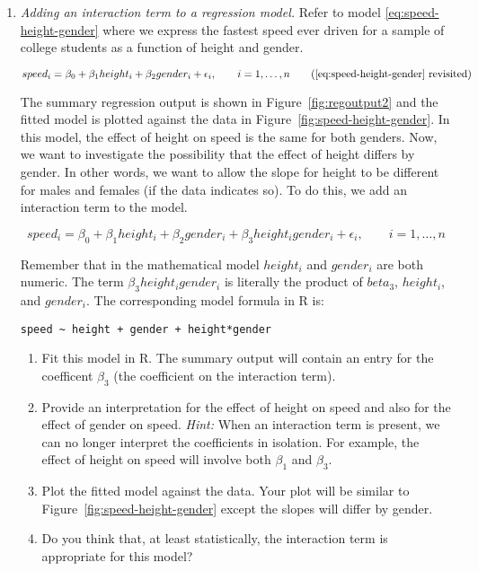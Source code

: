 \begin{enumerate}
\item \emph{Adding an interaction term to a regression model.}  Refer
  to model \ref{eq:speed-height-gender} where we express the fastest
  speed ever driven for a sample of college students as a function of
  height and gender. \label{ex:interaction}

\begin{equation*}
  speed_i = \beta_0 + \beta_1 height_i + \beta_2 gender_i + \epsilon_i, \qquad i=1,\ldots,n
\tag{\ref{eq:speed-height-gender} revisited}
\end{equation*}

The summary regression output is shown in Figure~\ref{fig:regoutput2}
and the fitted model is plotted against the data in
Figure~\ref{fig:speed-height-gender}. In this model, the effect
of height on speed is the same for both genders. Now, we want to investigate the
possibility that the effect of height differs by gender. In other words,
we want to allow the slope for height to be different for males and
females (if the data indicates so). To do this, we add an interaction 
term to the model.

\begin{equation}
  speed_i = \beta_0 + \beta_1 height_i + \beta_2 gender_i + \beta_3 height_i gender_i + 
\epsilon_i, \qquad i=1,\ldots,n
\end{equation}

Remember that in the mathematical model $height_i$ and $gender_i$ are both numeric.
The term $\beta_3 height_i gender_i$ is literally the product of $beta_3$, $height_i$,
and $gender_i$. The corresponding model formula in R is:
\begin{Verbatim}[samepage=true]
speed ~ height + gender + height*gender
\end{Verbatim}

\begin{enumerate}
\item Fit this model in R. The summary output will contain an entry for the
coefficent $\beta_3$ (the coefficient on the interaction term).
\item Provide an interpretation for the effect of height on speed and also
for the effect of gender on speed. \emph{Hint:} When an interaction term
is present, we can no longer interpret the coefficients in isolation. For example,
the effect of height on speed will involve both $\beta_1$ and $\beta_3$.
\item Plot the fitted model against the data. Your plot will be
  similar to Figure~\ref{fig:speed-height-gender} except the slopes
  will differ by gender.
\item Do you think that, at least statistically, the interaction term is
  appropriate for this model?
\end{enumerate}


\end{enumerate}
